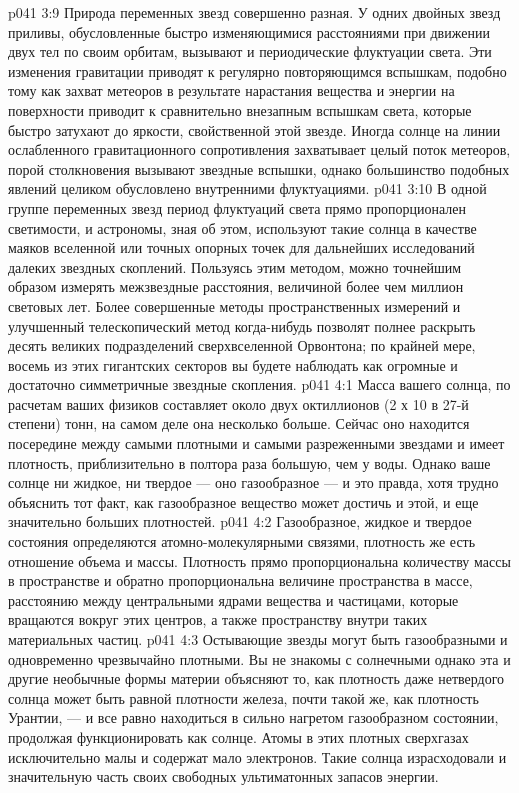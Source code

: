 \vs p041 3:9 Природа переменных звезд совершенно разная. У одних двойных звезд приливы, обусловленные быстро изменяющимися расстояниями при движении двух тел по своим орбитам, вызывают и периодические флуктуации света. Эти изменения гравитации приводят к регулярно повторяющимся вспышкам, подобно тому как захват метеоров в результате нарастания вещества и энергии на поверхности приводит к сравнительно внезапным вспышкам света, которые быстро затухают до яркости, свойственной этой звезде. Иногда солнце на линии ослабленного гравитационного сопротивления захватывает целый поток метеоров, порой столкновения вызывают звездные вспышки, однако большинство подобных явлений целиком обусловлено внутренними флуктуациями.
\vs p041 3:10 В одной группе переменных звезд период флуктуаций света прямо пропорционален светимости, и астрономы, зная об этом, используют такие солнца в качестве маяков вселенной или точных опорных точек для дальнейших исследований далеких звездных скоплений. Пользуясь этим методом, можно точнейшим образом измерять межзвездные расстояния, величиной более чем миллион световых лет. Более совершенные методы пространственных измерений и улучшенный телескопический метод когда\hyp{}нибудь позволят полнее раскрыть десять великих подразделений сверхвселенной Орвонтона; по крайней мере, восемь из этих гигантских секторов вы будете наблюдать как огромные и достаточно симметричные звездные скопления.
\vs p041 4:1 Масса вашего солнца, по расчетам ваших физиков составляет около двух октиллионов (2 х 10 в 27\hyp{}й степени) тонн, на самом деле она несколько больше. Сейчас оно находится посередине между самыми плотными и самыми разреженными звездами и имеет плотность, приблизительно в полтора раза большую, чем у воды. Однако ваше солнце ни жидкое, ни твердое --- оно газообразное --- и это правда, хотя трудно объяснить тот факт, как газообразное вещество может достичь и этой, и еще значительно больших плотностей.
\vs p041 4:2 \pc Газообразное, жидкое и твердое состояния определяются атомно\hyp{}молекулярными связями, плотность же есть отношение объема и массы. Плотность прямо пропорциональна количеству массы в пространстве и обратно пропорциональна величине пространства в массе, расстоянию между центральными ядрами вещества и частицами, которые вращаются вокруг этих центров, а также пространству внутри таких материальных частиц.
\vs p041 4:3 \pc Остывающие звезды могут быть газообразными и одновременно чрезвычайно плотными. Вы не знакомы с солнечными  однако эта и другие необычные формы материи объясняют то, как плотность даже нетвердого солнца может быть равной плотности железа, почти такой же, как плотность Урантии, --- и все равно находиться в сильно нагретом газообразном состоянии, продолжая функционировать как солнце. Атомы в этих плотных сверхгазах исключительно малы и содержат мало электронов. Такие солнца израсходовали и значительную часть своих свободных ультиматонных запасов энергии.
